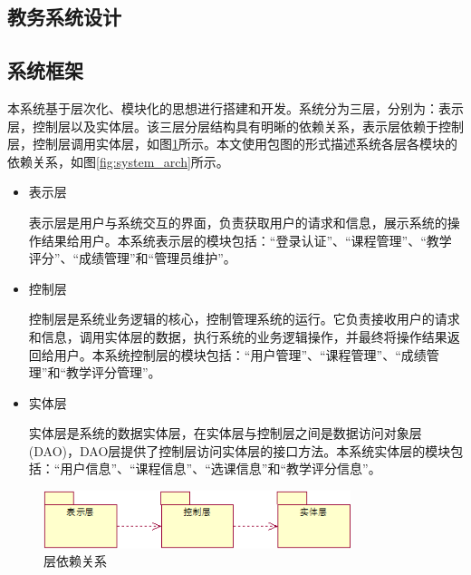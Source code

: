 \newpage
\begin{center}
  \section{教务系统设计}
\end{center}

\subsection{系统框架}\label{sec:system_frame}
本系统基于层次化、模块化的思想进行搭建和开发。系统分为三层，分别为：表示层，控制层以及实体层。该三层分层结构具有明晰的依赖关系，表示层依赖于控制层，控制层调用实体层，如图\ref{fig:level_depend}所示。本文使用包图的形式描述系统各层各模块的依赖关系，如图\ref{fig:system_arch}所示。

\begin{itemize}
  \item 表示层
  
  \CJKindent 表示层是用户与系统交互的界面，负责获取用户的请求和信息，展示系统的操作结果给用户。本系统表示层的模块包括：“登录认证”、“课程管理”、“教学评分”、“成绩管理”和“管理员维护”。
  
  \item 控制层
  
  \CJKindent 控制层是系统业务逻辑的核心，控制管理系统的运行。它负责接收用户的请求和信息，调用实体层的数据，执行系统的业务逻辑操作，并最终将操作结果返回给用户。本系统控制层的模块包括：“用户管理”、“课程管理”、“成绩管理”和“教学评分管理”。
  
  \item 实体层
  
  \CJKindent 实体层是系统的数据实体层，在实体层与控制层之间是数据访问对象层(DAO)，DAO层提供了控制层访问实体层的接口方法。本系统实体层的模块包括：“用户信息”、“课程信息”、“选课信息”和“教学评分信息”。
\end{itemize}

\begin{figure}[H]
  \centering
  \includegraphics[width=0.8\textwidth]{img/level_depend}
  \caption{层依赖关系}
  \label{fig:level_depend}
\end{figure}

